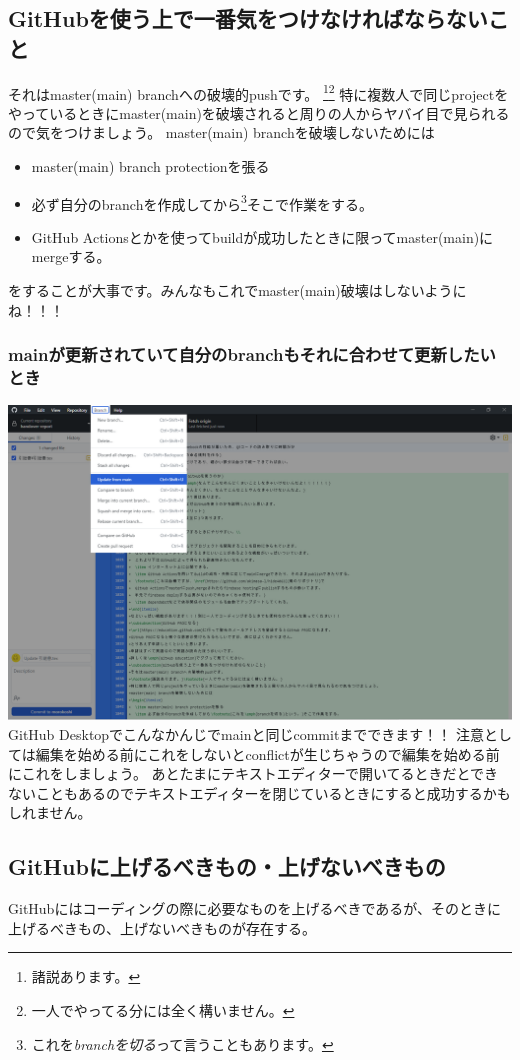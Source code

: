 \documentclass[dvipdfmx,jb5]{jreport}
\begin{document}
\subsection{GitHubを使う上で一番気をつけなければならないこと}
それはmaster(main) branchへの破壊的pushです。
\footnote{諸説あります。}\footnote{一人でやってる分には全く構いません。}
特に複数人で同じprojectをやっているときにmaster(main)を破壊されると周りの人からヤバイ目で見られるので気をつけましょう。
master(main) branchを破壊しないためには
\begin{itemize}
      \item master(main) branch protectionを張る
      \item 必ず自分のbranchを作成してから\footnote{これを\emph{branchを切る}って言うこともあります。}そこで作業をする。
      \item GitHub Actionsとかを使ってbuildが成功したときに限ってmaster(main)にmergeする。
\end{itemize}
をすることが大事です。みんなもこれでmaster(main)破壊はしないようにね！！！
\subsubsection{mainが更新されていて自分のbranchもそれに合わせて更新したいとき}
\includegraphics[width=15cm]{assets/update-branch.png}\\
GitHub Desktopでこんなかんじでmainと同じcommitまでできます！！
注意としては編集を始める前にこれをしないとconflictが生じちゃうので編集を始める前にこれをしましょう。
あとたまにテキストエディターで開いてるときだとできないこともあるのでテキストエディターを閉じているときにすると成功するかもしれません。
\subsection{GitHubに上げるべきもの・上げないべきもの}
GitHubにはコーディングの際に必要なものを上げるべきであるが、そのときに上げるべきもの、上げないべきものが存在する。
\end{document}
